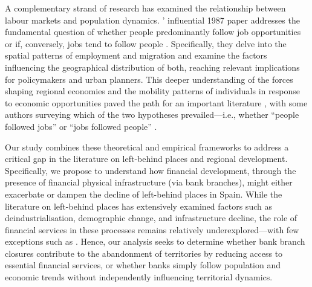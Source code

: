 \documentclass[a4paper,11pt,oneside]{article}
\begin{document}
A complementary strand of research has examined the relationship between labour markets and population dynamics. \citeauthor{carlino1987determinants}' influential 1987 paper addresses the fundamental question of whether people predominantly follow job opportunities or if, conversely, jobs tend to follow people \citep{carlino1987determinants}. Specifically, they delve into the spatial patterns of employment and migration and examine the factors influencing the geographical distribution of both, reaching relevant implications for policymakers and urban planners. This deeper understanding of the forces shaping regional economies and the mobility patterns of individuals in response to economic opportunities paved the path for an important literature \citep[see, for instance][]{boarnet1994empirical,henry2001spatial,feser2006harnessing,cho2007spatial}, with some authors surveying which of the two hypotheses prevailed---i.e., whether ``people followed jobs'' or ``jobs followed people'' \citep{hoogstra2017jobs}.






Our study combines these theoretical and empirical frameworks to address a critical gap in the literature on left-behind places and regional development. Specifically, we propose to understand how financial development, through the presence of financial physical infrastructure (via bank branches), might either exacerbate or dampen the decline of left-behind places in Spain. While the literature on left-behind places has extensively examined factors such as deindustrialisation, demographic change, and infrastructure decline, the role of financial services in these processes remains relatively underexplored---with few exceptions such as \cite{cowling2024getting}. Hence, our analysis seeks to determine whether bank branch closures contribute to the abandonment of territories by reducing access to essential financial services, or whether banks simply follow population and economic trends without independently influencing territorial dynamics.
\end{document}
